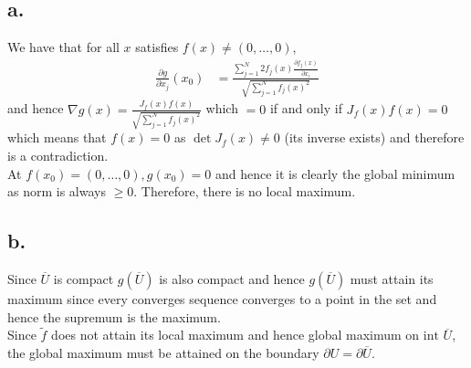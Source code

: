 \documentclass[11pt]{article}
\begin{document}
\subsection*{a.}
We have that for all $x$ satisfies $f(x) \ne (0,\ldots, 0)$,
\begin{equation*}
    \begin{aligned}
        \frac{\partial g}{\partial x_j}(x_0) &= \frac{\sum_{j=1}^N 2f_j(x) \frac{\partial f_j(x)}{\partial x_i}}{\sqrt{\sum_{j=1}^N f_j(x)^2}} 
    \end{aligned}
\end{equation*}
and hence $\nabla g(x) = \frac{J_f(x) f(x)}{\sqrt{\sum_{j=1}^N f_j(x)^2}}$
which $=0$ if and only if $J_f(x) f(x) = 0$ which means that $f(x) = 0$ as $\det J_f(x) \ne 0$ (its inverse exists) and therefore is a contradiction. \\
At $f(x_0) = (0,\ldots,0), g(x_0)= 0$ and hence it is clearly the global minimum as norm is always $\ge 0$. Therefore, there is no local maximum.  
\subsection*{b.}
Since $\overline{U}$ is compact $g(\overline{U})$ is also compact and hence $g(\overline{U})$ must attain its maximum since every converges sequence converges to a point in the set and hence the supremum is the maximum. \\
Since $\tilde{f}$ does not attain its local maximum and hence global maximum on $\text{int}$ $\overline{U}$, 
the global maximum must be attained on the boundary $\partial U = \partial \overline{U}$.  
\end{document}
